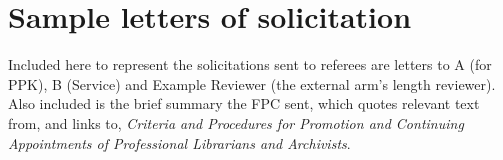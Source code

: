 \documentclass[12pt,oneside]{book}
\begin{document}
\newpage

\fancyfoot[C]{\leftmark} %



\chapter{Sample letters of solicitation}

Included here to represent the solicitations sent to referees are letters to A (for PPK), B (Service) and Example Reviewer (the external arm's length reviewer).  Also included is the brief summary the FPC sent, which quotes relevant text from, and links to, \textit{Criteria and Procedures for Promotion and Continuing Appointments of Professional Librarians and Archivists}.


\end{document}
